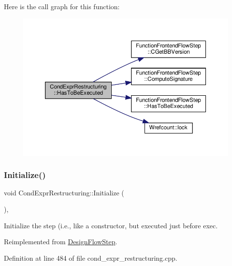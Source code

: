 Here is the call graph for this function\+:
\nopagebreak
\begin{figure}[H]
\begin{center}
\leavevmode
\includegraphics[width=350pt]{dd/d33/classCondExprRestructuring_a4442cdaca3a1345d45f17912918f1392_cgraph}
\end{center}
\end{figure}
\mbox{\label{classCondExprRestructuring_a5ac68a27de704107d9e33b3a93751a73}} 
\subsubsection{\texorpdfstring{Initialize()}{Initialize()}}
{\footnotesize\ttfamily void Cond\+Expr\+Restructuring\+::\+Initialize (\begin{DoxyParamCaption}{ }\end{DoxyParamCaption})\hspace{0.3cm}{\ttfamily [override]}, {\ttfamily [virtual]}}



Initialize the step (i.\+e., like a constructor, but executed just before exec. 



Reimplemented from \hyperlink{classDesignFlowStep_a44b50683382a094976e1d432a7784799}{Design\+Flow\+Step}.



Definition at line 484 of file cond\+\_\+expr\+\_\+restructuring.\+cpp.




